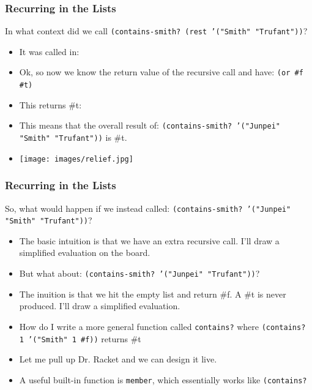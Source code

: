\documentclass{beamer}
\begin{document}
\begin{frame}
  \frametitle{Recurring in the Lists}
  In what context did we call \texttt{(contains-smith? (rest '("Smith" "Trufant"))}?
  \begin{itemize}
  \item<2-> It was called in:
    \ContainsElseEvalOne
  \item<3-> Ok, so now we know the return value of the recursive
    call and have:
    \texttt{(or \#f \#t)}
  \item<4-> This returns \#t:
  \item<5-> This means that the overall result of:
    \texttt{(contains-smith? '("Junpei" "Smith" "Trufant"))} is \#t.
  \item<6-> 
    \texttt{[image: images/relief.jpg]}
  \end{itemize}
\end{frame}

\begin{frame}
  \frametitle{Recurring in the Lists}
  So, what would happen if we instead called:
  \texttt{(contains-smith? '("Junpei" "Smith" "Trufant"))}?
  \begin{itemize}
  \item<2-> The basic intuition is that we have an extra recursive call. I'll draw a simplified evaluation on the board.
  \item<3-> But what about: \texttt{(contains-smith? '("Junpei" "Trufant"))}?
  \item<4-> The inuition is that we hit the empty list and return \#f. A \#t is never produced. I'll draw a simplified evaluation.
  \item<5-> How do I write a more general function called
    \texttt{contains?} where \texttt{(contains? 1 '("Smith" 1 \#f))} returns \#t
  \item<6-> Let me pull up Dr. Racket and we can design it live.
  \item<7-> A useful built-in function is \texttt{member}, which
    essentially works like \texttt{(contains?}
  \end{itemize}
\end{frame}
\end{document}
